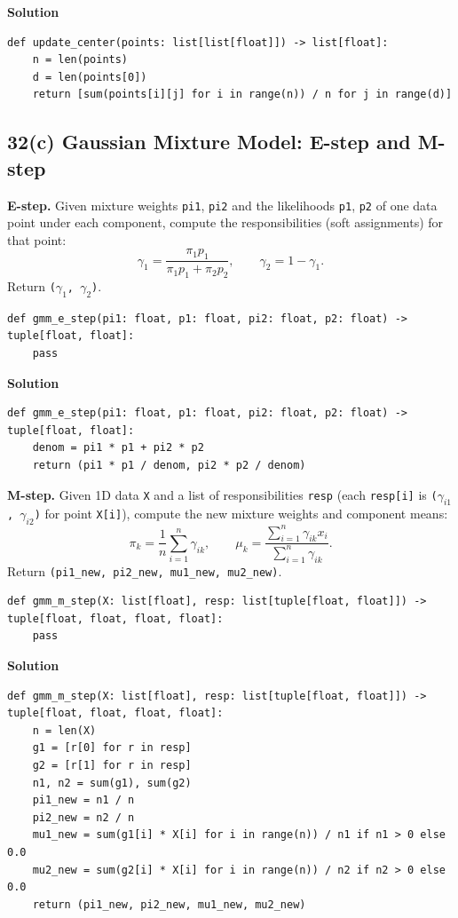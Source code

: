 \documentclass[11pt]{article}
\begin{document}
\medskip
\noindent\textbf{Solution}
\begin{lstlisting}
def update_center(points: list[list[float]]) -> list[float]:
    n = len(points)
    d = len(points[0])
    return [sum(points[i][j] for i in range(n)) / n for j in range(d)]
\end{lstlisting}

\subsection*{32(c) Gaussian Mixture Model: E-step and M-step}

\textbf{E-step.} Given mixture weights \texttt{pi1}, \texttt{pi2} and the likelihoods \texttt{p1}, \texttt{p2} of one data point under each component, compute the responsibilities (soft assignments) for that point:
\[
\gamma_1 = \frac{\pi_1 p_1}{\pi_1 p_1 + \pi_2 p_2}, \qquad \gamma_2 = 1 - \gamma_1.
\]
Return \texttt{($\gamma_1$, $\gamma_2$)}.

\begin{lstlisting}
def gmm_e_step(pi1: float, p1: float, pi2: float, p2: float) -> tuple[float, float]:
    pass
\end{lstlisting}

\medskip
\noindent\textbf{Solution}
\begin{lstlisting}
def gmm_e_step(pi1: float, p1: float, pi2: float, p2: float) -> tuple[float, float]:
    denom = pi1 * p1 + pi2 * p2
    return (pi1 * p1 / denom, pi2 * p2 / denom)
\end{lstlisting}

\textbf{M-step.} Given 1D data \texttt{X} and a list of responsibilities \texttt{resp} (each \texttt{resp[i]} is \texttt{($\gamma_{i1}$, $\gamma_{i2}$)} for point \texttt{X[i]}), compute the new mixture weights and component means:
\[
\pi_k = \frac{1}{n}\sum_{i=1}^n \gamma_{ik}, \qquad \mu_k = \frac{\sum_{i=1}^n \gamma_{ik} x_i}{\sum_{i=1}^n \gamma_{ik}}.
\]
Return \texttt{(pi1\_new, pi2\_new, mu1\_new, mu2\_new)}.

\begin{lstlisting}
def gmm_m_step(X: list[float], resp: list[tuple[float, float]]) -> tuple[float, float, float, float]:
    pass
\end{lstlisting}

\medskip
\noindent\textbf{Solution}
\begin{lstlisting}
def gmm_m_step(X: list[float], resp: list[tuple[float, float]]) -> tuple[float, float, float, float]:
    n = len(X)
    g1 = [r[0] for r in resp]
    g2 = [r[1] for r in resp]
    n1, n2 = sum(g1), sum(g2)
    pi1_new = n1 / n
    pi2_new = n2 / n
    mu1_new = sum(g1[i] * X[i] for i in range(n)) / n1 if n1 > 0 else 0.0
    mu2_new = sum(g2[i] * X[i] for i in range(n)) / n2 if n2 > 0 else 0.0
    return (pi1_new, pi2_new, mu1_new, mu2_new)
\end{lstlisting}
\end{document}
